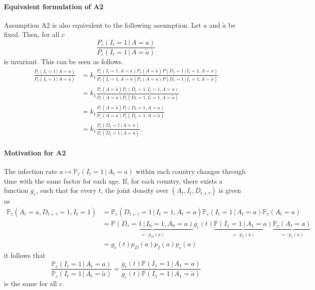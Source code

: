 \documentclass[a4paper]{article}
\renewcommand\P{\mathbb{P}}
\newcommand{\given}{\, \vert \,}
\begin{document}
\paragraph{Equivalent formulation of A2}
Assumption A2 is also equivalent to the following assumption. 
Let $a$ and $\tilde{a}$ be fixed. Then, for all $c$
\begin{equation} \label{eq:equiv3}
\frac{P_c(I_t = 1\,|\,A = a)}{P_c(I_t = 1\,|\,A = \tilde{a})} 
\end{equation}
is invariant.
{\color{gray} This can be seen as follows.
\begin{align*}
\frac{P_c(I_t = 1\,|\,A = a)}{P_c(I_t = 1\,|\,A = \tilde{a})} 
&= k_1
\frac{P_c(I_t = 1,A = a)P_c(A = \tilde{a})
P(D_t = 1\,|\,I_t = 1, A = a)}
{P_c(I_t = 1,A = \tilde{a})P_c(A = a)P(D_t = 1\,|\,I_t = 1, A = \tilde{a})} \\
&= k_1
\frac{P_c(A = \tilde{a})
P_c(D_t = 1,I_t = 1, A = a)}
{P_c(A = a)P_c(D_t = 1,I_t = 1, A = \tilde{a})}\\
&= k_1
\frac{P_c(A = \tilde{a})
P_c(D_t = 1,A = a)}
{P_c(A = a)P_c(D_t = 1, A = \tilde{a})}\\
&= k_1
\frac{P_c(D_t = 1\,|\,A = a)}
{P_c(D_t = 1\,|\, A = \tilde{a})}.
\end{align*}
}



\paragraph{Motivation for A2}
The infection rate $a \mapsto \P_c(I_{t} = 1 \given A_t = a)$ within 
each country changes through time with the same factor for each age. If, for each country, there exists a function $g_c$, such that for every $t$, the joint
density over $(A_t,I_t,D_{t+\tau})$ is given as
%
\begin{align*}
\P_c(A_t = a, D_{t+\tau} = 1, I_t = 1)	&= \P_c(D_{t+\tau} = 1 \given I_t = 1, A_t = a)  \P_c(I_t = 1 \given A_t = a) \P_c(A_t = a) \\
															&= \underbrace{\P(D_{\tau} = 1 \given I_0 = 1, A_0 = a)}_{=:p_D(a)} g_c(t) \underbrace{\P(I_1 = 1 \given A_1 = a)}_{=:p_I(a)} \underbrace{\P_c(A_t = a)}_{=:p_c(a)} \\
															&=  g_c(t) p_D(a) p_I(a) p_c(a)
\end{align*}
%
it follows that 
$$
\frac{\P_c(I_t = 1 \given A_t = a)}{\P_c(I_t = 1 \given A_t = \tilde{a})} 
= 
\frac{
g_c(t) \P(I_1 = 1 \given A_1 = a)}{
g_c(t) \P(I_1 = 1 \given A_1 = \tilde{a})}
$$
is the same for all $c$. 
\end{document}
